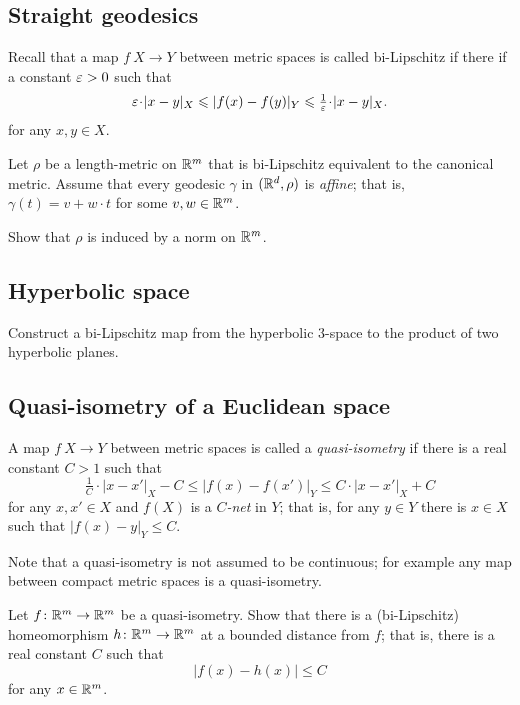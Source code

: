 \subsection*{Straight geodesics}
\label{Straight geodesics}

Recall that a map $f\:X\to Y$ between metric spaces is called bi-Lipschitz if there if a constant $\varepsilon>0$
such that 
\[\eps\cdot|x-y|_X\le|f(x)-f(y)|_Y\le\tfrac1\eps\cdot|x-y|_X.\]
for any $x,y\in X$.

\begin{pr}
Let $\rho$ be a length-metric on $\mathbb{R}^m$ that is bi-Lipschitz equivalent to the canonical metric.
Assume that every geodesic $\gamma$ in $(\mathbb{R}^d,\rho)$ is \emph{affine};
that is, $\gamma(t)=v+w\cdot t$ for some $v,w\in\mathbb{R}^m$.

Show that $\rho$ is induced by a norm on $\mathbb{R}^m$.
\end{pr}

\subsection*{Hyperbolic space}
\label{Hyperbolic space}


\begin{pr}
Construct a bi-Lipschitz map
from the hyperbolic $3$-space 
to the product of two hyperbolic planes.
\end{pr}

\subsection*{Quasi-isometry of a Euclidean space\thm}
\label{hom-near-QI} 

A map $f\:X\to Y$ between metric spaces is called a \emph{quasi-isometry} if there is a  real constant $C>1$ such that 
$$\tfrac{1}{C}\cdot|x-x'|_X-C
\le 
|f(x)-f(x')|_Y\le C\cdot|x-x'|_X+C$$
for any $x,x'\in X$ and $f(X)$ is a \emph{$C$-net} in $Y$;
that is, for any $y\in Y$ there is $x\in X$ such that $|f(x)-y|_Y\le C$.


Note that a quasi-isometry is not assumed to be continuous;
for example any map between compact metric spaces is a quasi-isometry.

\begin{pr}
Let $f\colon\mathbb{R}^m\to\mathbb{R}^m$ be a quasi-isometry.
Show that there is a (bi-Lipschitz) homeomorphism 
$h\colon\mathbb{R}^m\to\mathbb{R}^m$ at a bounded distance from $f$;
that is, there is a real constant $C$ such that
$$|f(x)-h(x)|\le C$$
for any $x\in\mathbb{R}^m$.
\end{pr}

